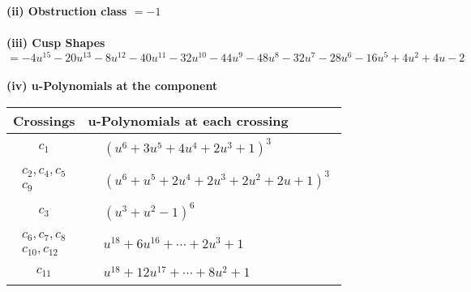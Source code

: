 \documentclass[1p]{elsarticle_modified}
\theoremstyle{definition}
\begin{document}
\flushleft \textbf{(ii) Obstruction class $= -1$}\\~\\
\flushleft \textbf{(iii) Cusp Shapes $= -4 u^{15}-20 u^{13}-8 u^{12}-40 u^{11}-32 u^{10}-44 u^9-48 u^8-32 u^7-28 u^6-16 u^5+4 u^2+4 u-2$}\\~\\
\newpage\renewcommand{\arraystretch}{1}
\flushleft \textbf{(iv) u-Polynomials at the component}\newline \\
\begin{tabular}{m{50pt}|m{274pt}}
Crossings & \hspace{64pt}u-Polynomials at each crossing \\
\hline $$\begin{aligned}c_{1}\end{aligned}$$&$\begin{aligned}
&(u^6+3 u^5+4 u^4+2 u^3+1)^3
\end{aligned}$\\
\hline $$\begin{aligned}c_{2},c_{4},c_{5}\\c_{9}\end{aligned}$$&$\begin{aligned}
&(u^6+u^5+2 u^4+2 u^3+2 u^2+2 u+1)^3
\end{aligned}$\\
\hline $$\begin{aligned}c_{3}\end{aligned}$$&$\begin{aligned}
&(u^3+u^2-1)^6
\end{aligned}$\\
\hline $$\begin{aligned}c_{6},c_{7},c_{8}\\c_{10},c_{12}\end{aligned}$$&$\begin{aligned}
&u^{18}+6 u^{16}+\cdots+2 u^3+1
\end{aligned}$\\
\hline $$\begin{aligned}c_{11}\end{aligned}$$&$\begin{aligned}
&u^{18}+12 u^{17}+\cdots+8 u^2+1
\end{aligned}$\\
\hline
\end{tabular}\\~\\
\newpage\renewcommand{\arraystretch}{1}
\end{document}
